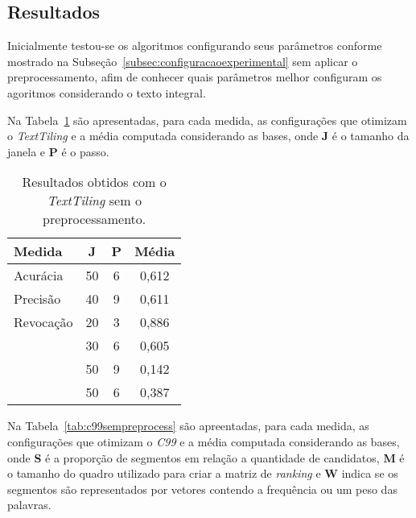 %





\subsection{Resultados}
	\label{subsec:resultados}

Inicialmente testou-se os algoritmos configurando seus parâmetros conforme mostrado na Subseção~\ref{subsec:configuracaoexperimental} sem aplicar o preprocessamento, afim de conhecer quais parâmetros melhor configuram os agoritmos considerando o texto integral.
% 


Na Tabela~\ref{tab:texttilingsempreprocess} são apresentadas, para cada medida, as configurações que otimizam o \textit{TextTiling} e a média computada considerando as bases, onde \textbf{J} é o tamanho da janela e \textbf{P} é o passo.

\begin{table}[!h]
	\centering
	\begin{tabular}{|l|c|c|c|} \hline
		\textbf{Medida} & \textbf{J} & \textbf{P} & \textbf{Média}\\		\hline

		Acurácia	& 50 & 6 & 0,612 \\ \hline	
		Precisão	& 40 & 9 & 0,611 \\ \hline			
		Revocação	& 20 & 3 & 0,886 \\ \hline		
		\fum		& 30 & 6 & 0,605 \\ \hline	
		\pk			& 50 & 9 & 0,142 \\ \hline	
		\windiff	& 50 & 6 & 0,387 \\ \hline	

	\end{tabular}
	\caption{Resultados obtidos com o \textit{TextTiling} sem o preprocessamento.}
	\label{tab:texttilingsempreprocess}
\end{table}



Na Tabela~\ref{tab:c99sempreprocess} são apreentadas, para cada medida, as configurações que otimizam o \textit{C99} e a média computada considerando as bases, onde \textbf{S} é a proporção de segmentos em relação a quantidade de candidatos, \textbf{M} é o tamanho do quadro utilizado para criar a matriz de \textit{ranking} e \textbf{W} indica se os segmentos são representados por vetores contendo a frequência ou um peso das palavras. 

